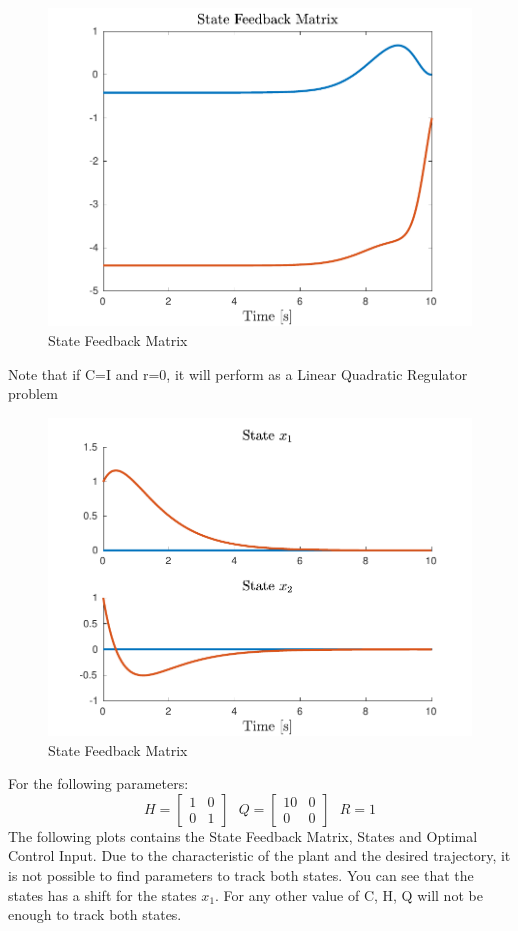 \documentclass{article}
\begin{document}
\begin{center} \begin{figure}[h]
\includegraphics [width=4.5in]{lq}
\caption{State Feedback Matrix}
\end{figure}  \end{center}
Note that if C=I and r=0, it will perform as a Linear Quadratic Regulator problem
\begin{center} \begin{figure}[h]
\includegraphics [width=4.5in]{lq2}
\caption{State Feedback Matrix}
\end{figure}  \end{center}
For the following parameters:
\begin{equation*}
H = 
\begin{bmatrix}
1  & 0 \\
0 & 1
\end{bmatrix}
\:\:\: 
Q = 
\begin{bmatrix}
10 & 0 \\
0 & 0
\end{bmatrix}
\:\:\: 
R = 1
\end{equation*}
The following plots contains the State Feedback Matrix, States and Optimal Control Input. Due to the characteristic of the plant and the desired trajectory, it is not possible to find parameters to track both states. You can see that the states has a shift for the states $x_1$. For any other value of C, H, Q will not be enough to track both states.
\end{document}
